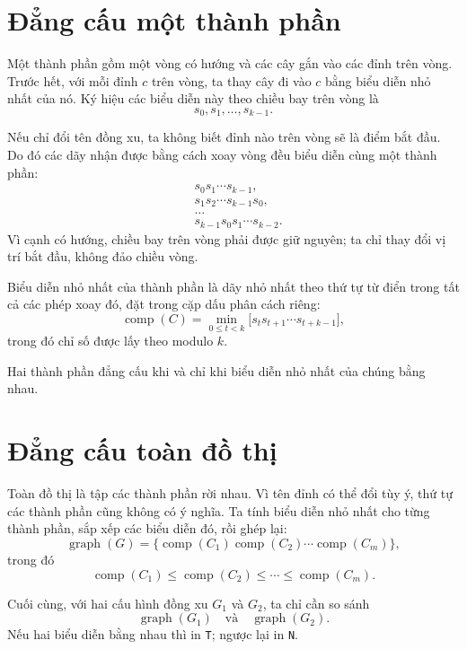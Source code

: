 \documentclass[11pt]{article}
\begin{document}
\section{Đẳng cấu một thành phần}

Một thành phần gồm một vòng có hướng và các cây gắn vào các đỉnh trên vòng.
Trước hết, với mỗi đỉnh \(c\) trên vòng, ta thay cây đi vào \(c\) bằng biểu
diễn nhỏ nhất của nó. Ký hiệu các biểu diễn này theo chiều bay trên vòng là
\[
  s_0,s_1,\ldots,s_{k-1}.
\]

Nếu chỉ đổi tên đồng xu, ta không biết đỉnh nào trên vòng sẽ là điểm bắt đầu.
Do đó các dãy nhận được bằng cách xoay vòng đều biểu diễn cùng một thành phần:
\[
\begin{aligned}
  &s_0s_1\cdots s_{k-1},\\
  &s_1s_2\cdots s_{k-1}s_0,\\
  &\ldots\\
  &s_{k-1}s_0s_1\cdots s_{k-2}.
\end{aligned}
\]
Vì cạnh có hướng, chiều bay trên vòng phải được giữ nguyên; ta chỉ thay đổi vị
trí bắt đầu, không đảo chiều vòng.

Biểu diễn nhỏ nhất của thành phần là dãy nhỏ nhất theo thứ tự từ điển trong
tất cả các phép xoay đó, đặt trong cặp dấu phân cách riêng:
\[
  \operatorname{comp}(C)
  =
  \min_{0\le t<k}
  \texttt{[}s_t s_{t+1}\cdots s_{t+k-1}\texttt{]},
\]
trong đó chỉ số được lấy theo modulo \(k\).

Hai thành phần đẳng cấu khi và chỉ khi biểu diễn nhỏ nhất của chúng bằng nhau.

\section{Đẳng cấu toàn đồ thị}

Toàn đồ thị là tập các thành phần rời nhau. Vì tên đỉnh có thể đổi tùy ý, thứ
tự các thành phần cũng không có ý nghĩa. Ta tính biểu diễn nhỏ nhất cho từng
thành phần, sắp xếp các biểu diễn đó, rồi ghép lại:
\[
  \operatorname{graph}(G)
  =
  \texttt{\{}
  \operatorname{comp}(C_1)
  \operatorname{comp}(C_2)
  \cdots
  \operatorname{comp}(C_m)
  \texttt{\}},
\]
trong đó
\[
  \operatorname{comp}(C_1)\le
  \operatorname{comp}(C_2)\le
  \cdots\le
  \operatorname{comp}(C_m).
\]

Cuối cùng, với hai cấu hình đồng xu \(G_1\) và \(G_2\), ta chỉ cần so sánh
\[
  \operatorname{graph}(G_1)
  \quad\text{và}\quad
  \operatorname{graph}(G_2).
\]
Nếu hai biểu diễn bằng nhau thì in \texttt{T}; ngược lại in \texttt{N}.
\end{document}
